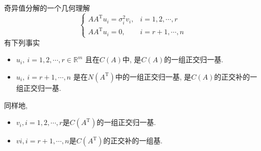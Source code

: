 奇异值分解的一个几何理解
\begin{equation}
  \begin{cases}
    A A^{\mathrm{T}} u_i = \sigma_i^{2} v_i, & i=1,2,\cdots,r
    \\
    A A^{\mathrm{T}} u_i = 0, &  i=r+1,\cdots,n
  \end{cases}
\end{equation}
有下列事实
\begin{itemize}
    \item $u_i, \ i=1,2,\cdots,r \in \mathbb{R}^{m} $ 且在$C\left( A \right) $中, 是$C\left( A \right) $的一组正交归一基.
    \item $u_i, \ i=r+1,\cdots,n $ 是在$N\left( A^{\mathrm{T}} \right) $中的一组正交归一基, 是$C\left( A \right) $的正交补的一组正交归一基.
\end{itemize}
同样地,
\begin{itemize}
    \item $v_i, i=1,2,\cdots,r$是$C\left( A^{\mathrm{T}} \right) $的一组正交归一基.
    \item $vi, i=r+1,\cdots ,n$是$C\left( A^{\mathrm{T}} \right) $的正交补的一组基.
\end{itemize}
